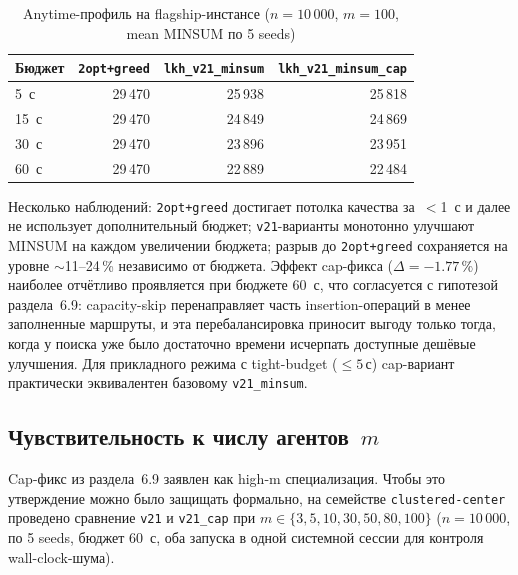 \documentclass[14pt,a4paper]{extarticle}
\begin{document}
\begin{table}[H]
\centering
\caption{Anytime-профиль на flagship-инстансе ($n=10\,000$, $m=100$, mean MINSUM по 5 seeds)}
\small
\begin{tabular}{lrrr}
\toprule
Бюджет & \texttt{2opt+greed} & \texttt{lkh\_v21\_minsum} & \texttt{lkh\_v21\_minsum\_cap}\\
\midrule
5~с  & 29\,470 & 25\,938 & 25\,818\\
15~с & 29\,470 & 24\,849 & 24\,869\\
30~с & 29\,470 & 23\,896 & 23\,951\\
60~с & 29\,470 & 22\,889 & 22\,484\\
\bottomrule
\end{tabular}
\normalsize
\end{table}

Несколько наблюдений: \texttt{2opt+greed} достигает потолка качества за~$<$1~с и далее не использует дополнительный бюджет; \texttt{v21}-варианты монотонно улучшают MINSUM на каждом увеличении бюджета; разрыв до \texttt{2opt+greed} сохраняется на уровне $\sim$11--24\,\% независимо от бюджета. Эффект cap-фикса ($\Delta = -1.77\,\%$) наиболее отчётливо проявляется при бюджете 60~с, что согласуется с гипотезой раздела~6.9: capacity-skip перенаправляет часть insertion-операций в менее заполненные маршруты, и эта перебалансировка приносит выгоду только тогда, когда у поиска уже было достаточно времени исчерпать доступные дешёвые улучшения. Для прикладного режима с tight-budget ($\leq 5\,$с) cap-вариант практически эквивалентен базовому \texttt{v21\_minsum}.

\subsection{Чувствительность к числу агентов~$m$}

Cap-фикс из раздела~6.9 заявлен как high-m специализация. Чтобы это утверждение можно было защищать формально, на семействе \texttt{clustered-center} проведено сравнение \texttt{v21} и \texttt{v21\_cap} при $m \in \{3,5,10,30,50,80,100\}$ ($n=10\,000$, по 5 seeds, бюджет 60~с, оба запуска в одной системной сессии для контроля wall-clock-шума).
\end{document}
